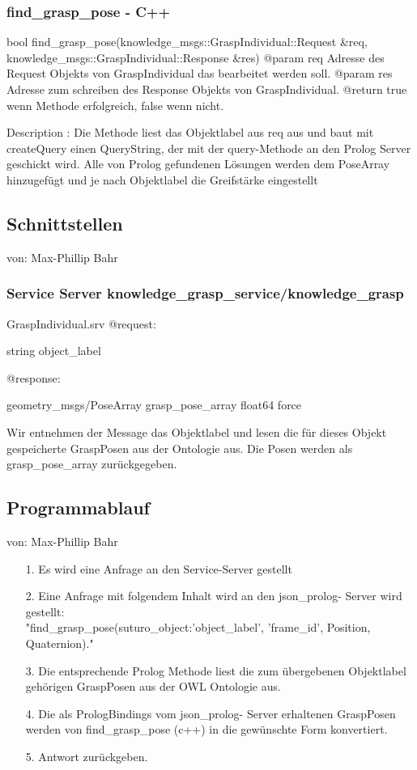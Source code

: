 \documentclass{suturo}
\makeatletter
\newcommand{\chapterauthor}[1]{%
  {\parindent0pt\vspace*{-27pt}%
  \linespread{0}\small\begin{flushright}von: #1\end{flushright}%
  \par\nobreak\vspace*{0pt}}
  \@afterheading%
}
\makeatother
\begin{document}
\subsubsection{find\_grasp\_pose - C++}
\begin{spverbatim}
bool find_grasp_pose(knowledge_msgs::GraspIndividual::Request  &req, 
                             knowledge_msgs::GraspIndividual::Response &res)
@param req Adresse des Request Objekts von GraspIndividual das bearbeitet 
           werden soll.
@param res Adresse zum schreiben des Response Objekts von GraspIndividual.
@return true wenn Methode erfolgreich, false wenn nicht.

Description : Die Methode liest das Objektlabel aus req aus und baut mit 
createQuery einen QueryString, der mit der query-Methode an den Prolog Server 
geschickt wird. Alle von Prolog gefundenen Lösungen werden dem PoseArray 
hinzugefügt und je nach Objektlabel die Greifstärke eingestellt
\end{spverbatim}

\subsection{Schnittstellen}
\chapterauthor{Max-Phillip Bahr}

\subsubsection{Service Server knowledge\_grasp\_service/knowledge\_grasp}
\begin{spverbatim}
GraspIndividual.srv
@request:

	string object_label

@response: 

	geometry_msgs/PoseArray grasp_pose_array
	float64 force
\end{spverbatim}
Wir entnehmen der Message das Objektlabel und lesen die für dieses Objekt gespeicherte GraspPosen aus der Ontologie aus. Die Posen werden als grasp\_pose\_array zurückgegeben.

\subsection{Programmablauf}
\chapterauthor{Max-Phillip Bahr}
\begin{itemize}
\item[1.]Es wird eine Anfrage an den Service-Server gestellt
\item[2.]Eine Anfrage mit folgendem Inhalt wird an den json\_prolog- Server wird gestellt:\\ "find\_grasp\_pose(suturo\_object:'object\_label', 'frame\_id', Position, Quaternion)." 
\item[3.]Die entsprechende Prolog Methode liest die zum übergebenen Objektlabel gehörigen GraspPosen aus der OWL Ontologie aus.
\item[4.] Die als PrologBindings vom json\_prolog- Server erhaltenen GraspPosen werden von find\_grasp\_pose (c++) in die gewünschte Form konvertiert.
\item[5.] Antwort zurückgeben.
\end{itemize}
\end{document}
